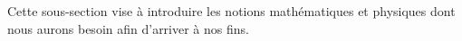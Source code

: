 Cette sous-section vise à introduire les notions mathématiques et physiques dont nous aurons besoin afin d'arriver à nos fins. 
%		
%			
%			
%			
%			
%			
%			
%			
%			
%			
%			
%			
%			
%			
%			
%			
%			
%		
